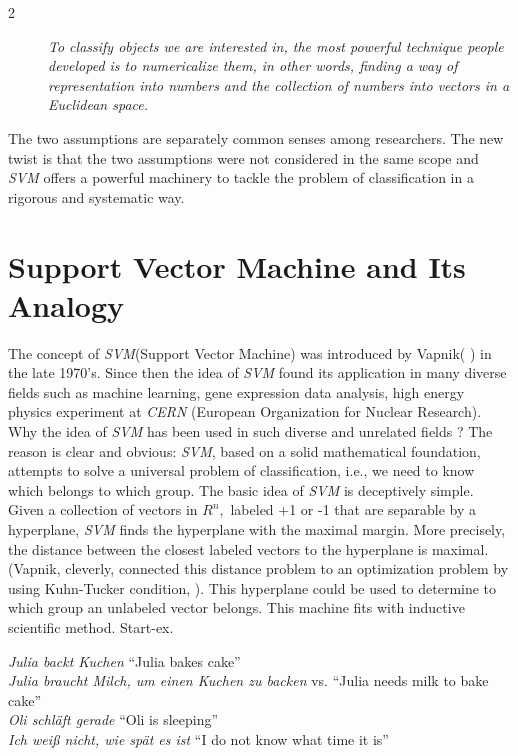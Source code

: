\documentclass{amsart}%
\theoremstyle{plain}
\numberwithin{equation}{section}
\begin{document}
\begin{description}
\item[2]  \emph{To classify objects we are interested in, the most powerful
technique people developed is to numericalize them, in other words, finding
a way of representation into numbers and the collection of numbers into
vectors in a Euclidean space.}
\end{description}

The two assumptions are separately common senses among researchers. The new
twist is that the two assumptions were not considered in the same scope and 
\emph{SVM} offers a powerful machinery to tackle the problem of
classification in a rigorous and systematic way.

\section{Support Vector Machine and Its Analogy}

The concept of \emph{SVM}(Support Vector Machine) was introduced by Vapnik(%
\cite{Va}) in the late 1970's. Since then the idea of \emph{SVM} found its
application in many diverse fields such as machine learning, gene expression
data analysis, high energy physics experiment at \emph{CERN} (European
Organization for Nuclear Research). Why the idea of \emph{SVM} has
been used in such diverse and unrelated fields ? The reason is clear and obvious: \emph{%
SVM}, based on a solid mathematical foundation, attempts to solve a
universal problem of classification, i.e., we need to know which belongs to
which group. The basic idea of \emph{SVM} is deceptively simple. Given a
collection of vectors in $R^n,$ labeled +1 or -1 that are separable by a
hyperplane, \emph{SVM} finds the hyperplane with the maximal margin. More
precisely, the distance between the closest labeled vectors to the
hyperplane is maximal.(Vapnik, cleverly, connected this distance problem to
an optimization problem by using Kuhn-Tucker condition, \cite{Si}). This
hyperplane could be used to determine to which group an unlabeled vector belongs. This machine fits with inductive scientific method.   Start-ex. %



\ea
\ex \textit{Julia backt Kuchen}
 ``Julia bakes cake'' \label{bsp1}\\
\ex \textit{Julia braucht Milch, um einen Kuchen zu backen} vs. \textit{}
 ``Julia needs milk to bake cake'' \label{bsp2}\\
\ex \textit{Oli schl\"aft gerade}
 ``Oli is sleeping'' \label{bsp3}\\
\ex \textit{Ich weiß nicht, wie sp\"at es ist} ``I do not know what time it is'' \label{bsp4}\\
\z
\end{document}

